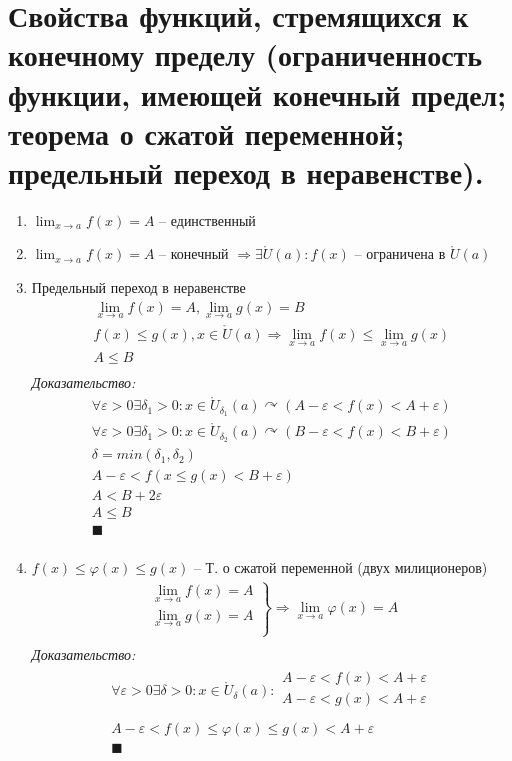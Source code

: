 \documentclass[12pt, fleqn]{article}
\begin{document}
\section{Свойства функций, стремящихся к конечному пределу (ограниченность функции, имеющей конечный предел; теорема о сжатой переменной; предельный переход в неравенстве).}
\begin{enumerate}
	\item $\lim_{x \to a} f(x)=A$ -- единственный
	\item $\lim_{x \to a} f(x) =A$ -- конечный $\Rightarrow \exists \mathring{U}(a)\colon f(x)$ -- ограничена в $\mathring{U}(a)$
	\item Предельный переход в неравенстве
	\begin{multline*}
		\lim_{x \to a}f(x)=A, \lim_{x \to a}g(x)=B\\
		f(x)\leq g(x), x \in \mathring{U}(a) \Rightarrow \lim_{x \to a}f(x)\leq \lim_{x \to a}g(x)\\
		A \leq B\\
	\end{multline*}
	\textit{Доказательство:}
	\begin{multline*}
			\forall \varepsilon > 0 \exists \delta_1>0\colon x\in \mathring{U}_{\delta_1}(a) \curvearrowright \left( A - \varepsilon < f(x) < A+ \varepsilon \right)\\
			\forall \varepsilon > 0 \exists \delta_1>0\colon x\in \mathring{U}_{\delta_2}(a) \curvearrowright \left( B - \varepsilon < f(x) < B+ \varepsilon \right)\\
			\delta = min(\delta_1, \delta_2)\\
			A-\varepsilon<f(x\leq g(x)<B+\varepsilon)\\
			A<B+2\varepsilon\\
			A\leq B\\
			\blacksquare\\
	\end{multline*}
	\item $f(x)\leq\varphi(x)\leq g(x)$ -- Т. о сжатой переменной (двух милиционеров)
	\begin{multline*}
		\left.
			\begin{gathered}
				\lim_{x \to a}f(x)=A\\
				\lim_{x \to a}g(x)=A\\
			\end{gathered}
		\right\}\Rightarrow \lim_{x \to a}\varphi(x) = A\\
	\end{multline*}
	\textit{Доказательство:}
	\begin{multline*}
		\forall \varepsilon >0 \exists \delta>0: x \in \mathring{U}_\delta(a)\colon\begin{gathered}
			A-\varepsilon < f(x)<A+\varepsilon\\
			A-\varepsilon < g(x)<A+\varepsilon\\
		\end{gathered}\\
		A-\varepsilon < f(x)\leq\varphi(x)\leq g(x)<A+\varepsilon\\
		\blacksquare\\
	\end{multline*}
\end{enumerate}
\end{document}

